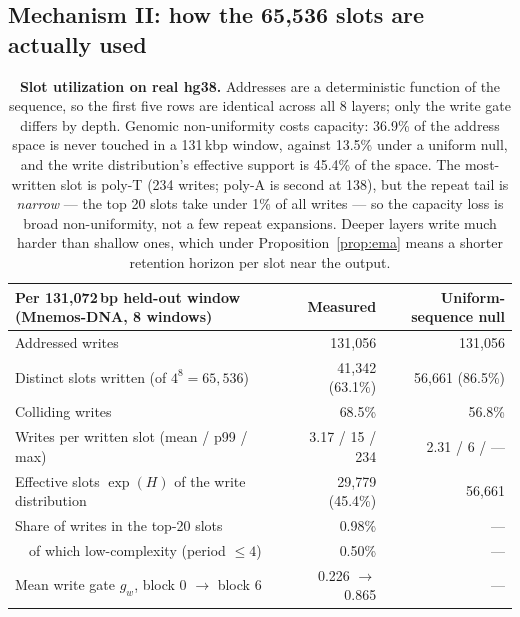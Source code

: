 \documentclass[11pt]{article}
\theoremstyle{plain}
\begin{document}
\FloatBarrier
\subsection{Mechanism II: how the 65{,}536 slots are actually used}\label{sec:exp-slots}

\begin{table}[!tbp]
\centering\small
\begin{tabular}{lrr}
\toprule
Per 131{,}072\,bp held-out window (Mnemos-DNA, 8 windows) & Measured & Uniform-sequence null \\
\midrule
Addressed writes                              & 131{,}056 & 131{,}056 \\
Distinct slots written (of $4^8=65{,}536$)    & 41{,}342 (63.1\%) & 56{,}661 (86.5\%) \\
Colliding writes                              & 68.5\%   & 56.8\% \\
Writes per written slot (mean / p99 / max)    & 3.17 / 15 / 234 & 2.31 / 6 / --- \\
Effective slots $\exp(H)$ of the write distribution & 29{,}779 (45.4\%) & 56{,}661 \\
Share of writes in the top-20 slots           & 0.98\%   & --- \\
\ \ of which low-complexity (period $\le4$)   & 0.50\%   & --- \\
Mean write gate $g_w$, block 0 $\to$ block 6  & 0.226 $\to$ 0.865 & --- \\
\bottomrule
\end{tabular}
\caption{\textbf{Slot utilization on real hg38.} Addresses are a deterministic function of the
sequence, so the first five rows are identical across all 8 layers; only the write gate differs
by depth. Genomic non-uniformity costs capacity: 36.9\% of the address space is never touched in a
131\,kbp window, against 13.5\% under a uniform null, and the write distribution's effective
support is 45.4\% of the space. The most-written slot is poly-T (234 writes; poly-A is second at
138), but the repeat tail is \emph{narrow} --- the top 20 slots take under 1\% of all writes ---
so the capacity loss is broad non-uniformity, not a few repeat expansions. Deeper layers write
much harder than shallow ones, which under Proposition~\ref{prop:ema} means a shorter retention
horizon per slot near the output.}
\label{tab:slots}
\end{table}
\end{document}

